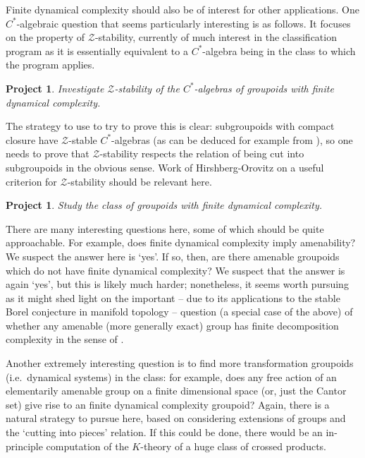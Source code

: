 \documentclass[11pt]{article}
\theoremstyle{plain}
\newtheorem{project}[theorem]{Project}
\theoremstyle{definition}
\theoremstyle{remark}
\begin{document}
Finite dynamical complexity should also be of interest for other applications.  One $C^*$-algebraic question that seems particularly interesting is as follows.  It focuses on the property of $\mathcal{Z}$-stability, currently of much interest in the classification program as it is essentially equivalent to a $C^*$-algebra being in the class to which the program applies.

\begin{project}\label{z stable proj}
Investigate $\mathcal{Z}$-stability of the $C^*$-algebras of groupoids with finite dynamical complexity.
\end{project}

The strategy to use to try to prove this is clear: subgroupoids with compact closure have $\mathcal{Z}$-stable $C^*$-algebras (as can be deduced for example from \cite{Winter:2004rb}), so one needs to prove that $\mathcal{Z}$-stability respects the relation of being cut into subgroupoids in the obvious sense.  Work of Hirshberg-Orovitz \cite{Hirshberg:2013aa} on a useful criterion for $\mathcal{Z}$-stability should be relevant here.


\begin{project}
Study the class of groupoids with finite dynamical complexity.
\end{project}

There are many interesting questions here, some of which should be quite approachable.  For example, does finite dynamical complexity imply amenability?  We suspect the answer here is `yes'.  If so, then, are there amenable groupoids which do not have finite dynamical complexity?  We suspect that the answer is again `yes', but this is likely much harder; nonetheless, it seems worth pursuing as it might shed light on the important -- due to its applications to the stable Borel conjecture in manifold topology -- question (a special case of the above) of whether any amenable (more generally exact) group has finite decomposition complexity in the sense of \cite{Guentner:2013aa}.

Another extremely interesting question is to find more transformation groupoids (i.e.\ dynamical systems) in the class: for example, does any free action of an elementarily amenable group on a finite dimensional space (or, just the Cantor set) give rise to an finite dynamical complexity groupoid?  Again, there is a natural strategy to pursue here, based on considering extensions of groups and the `cutting into pieces' relation.  If this could be done, there would be an in-principle computation of the $K$-theory of a huge class of crossed products.
\end{document}
